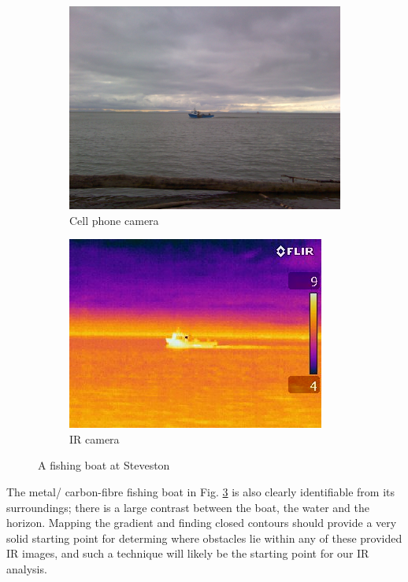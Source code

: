 \begin{figure}
\centering
\begin{subfigure}{.5\textwidth}
  \centering
  \includegraphics[width=.8\linewidth]{"./image/steveston-noon-fishing-visible"}
  \caption{Cell phone camera}
  \label{fig:sub1}
\end{subfigure}%
\begin{subfigure}{.5\textwidth}
  \centering
  \includegraphics[width=.8\linewidth]{"./image/steveston-noon-fishing-ir"}
  \caption{IR camera}
  \label{fig:sub2}
\end{subfigure}
\caption{A fishing boat at Steveston }
\label{fig:IR comparison of a fishing boat in the afternoon}
\end{figure}

The metal/ carbon-fibre fishing boat in Fig. \ref{fig:IR comparison of a fishing boat in the afternoon} is also clearly identifiable from its surroundings; there is a large contrast between the boat, the water and the horizon. Mapping the gradient and finding closed contours should provide a very solid starting point for determing where obstacles lie within any of these provided IR images, and such a technique will likely be the starting point for our IR analysis. 


